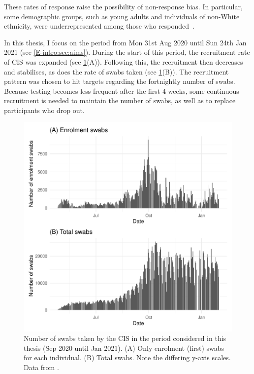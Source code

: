 \documentclass[thesis.tex]{subfiles}
\begin{document}
These rates of response raise the possibility of non-response bias.
In particular, some demographic groups, such as young adults and individuals of non-White ethnicity, were underrepresented among those who responded~\autocite{pouwelsCommunity}.

In this thesis, I focus on the period from Mon 31st Aug 2020 until Sun 24th Jan 2021 (see \cref{E-intro:sec:aims}).
During the start of this period, the recruitment rate of CIS was expanded (see \cref{biology-data:fig:CIS-recruitment}(A)).
Following this, the recruitment then decreases and stabilises, as does the rate of swabs taken (see \cref{biology-data:fig:CIS-recruitment}(B)).
The recruitment pattern was chosen to hit targets regarding the fortnightly number of swabs.
Because testing becomes less frequent after the first 4 weeks, some continuous recruitment is needed to maintain the number of swabs, as well as to replace participants who drop out.

\begin{figure}
  \centering \includegraphics{biology-data/CIS-recruitment}
  \caption[CIS swab numbers]{%
    Number of swabs taken by the CIS in the period considered in this thesis (Sep 2020 until Jan 2021).
    (A) Only enrolment (\ie first) swabs for each individual.
    (B) Total swabs.
    Note the differing y-axis scales.
    Data from \textcite{CIStechData}.
  }
  \label{biology-data:fig:CIS-recruitment}
\end{figure}
\end{document}
